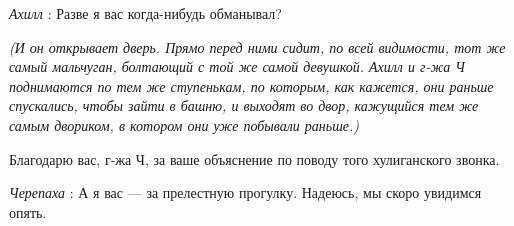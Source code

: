 \documentclass[../main.tex]{subfiles}
\begin{document}
\begin{dialogue}
\emph{Ахилл} : Разве я вас когда-нибудь обманывал?

\emph{(И он открывает дверь. Прямо перед ними сидит, по всей видимости, тот же самый мальчуган, болтающий с той же самой девушкой. Ахилл и г-жа Ч поднимаются по тем же ступенькам, по которым, как кажется, они раньше спускались, чтобы зайти в башню, и выходят во двор, кажущийся тем же самым двориком, в котором они уже побывали раньше.)}

Благодарю вас, г-жа Ч, за ваше объяснение по поводу того хулиганского звонка.

\emph{Черепаха} : А я вас --- за прелестную прогулку. Надеюсь, мы скоро увидимся опять.

\end{dialogue}
\end{document}
